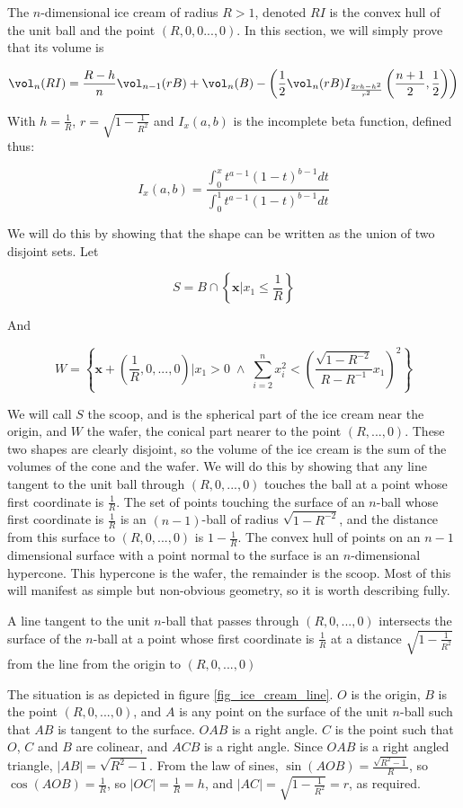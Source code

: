 The $n$-dimensional ice cream of radius $R>1$, denoted $RI$ is the convex hull of the unit ball and the point $(R,0,0...,0)$. In this section, we will simply prove that its volume is

$$
\vol_n(RI) = \frac{R-h}{n} \vol_{n-1}(rB) + \vol_n(B) - \left(\frac{1}{2}\vol_n(rB) I_{\frac{2rh-h^2}{r^2}}\left(\frac{n+1}{2}, \frac{1}{2}\right)\right)
$$

With $h = \frac{1}{R}$, $r = \sqrt{1-\frac{1}{R^2}}$ and $I_x(a,b)$ is the incomplete beta function, defined thus:

$$
I_x(a,b) = \frac{\int^x_0 t^{a-1}(1-t)^{b-1}dt}{\int^1_0 t^{a-1}(1-t)^{b-1} dt}
$$

We will do this by showing that the shape can be written as the union of two disjoint sets. Let

$$
S = B \cap \left\{{\bm x} | x_1 \leqslant \frac{1}{R}\right\}
$$

And

$$
W = \left\{{\bm x} + \left(\frac{1}{R}, 0, ..., 0\right) | x_1 > 0 \; \wedge \; \sum^{n}_{i=2} x_i^2 < \left(\frac{\sqrt{1-R^{-2}}}{R-R^{-1}} x_1\right)^2 \right\}
$$

We will call $S$ the scoop, and is the spherical part of the ice cream near the origin, and $W$ the wafer, the conical part nearer to the point $(R,...,0)$. These two shapes are clearly disjoint, so the volume of the ice cream is the sum of the volumes of the cone and the wafer. We will do this by showing that any line tangent to the unit ball through $(R,0,...,0)$ touches the ball at a point whose first coordinate is $\frac{1}{R}$.  The set of points touching the surface of an $n$-ball whose first coordinate is $\frac{1}{R}$ is an $(n-1)$-ball of radius $\sqrt{1-R^{-2}}$, and the distance from this surface to $(R,0,...,0)$ is $1-\frac{1}{R}$. The convex hull of points on an $n-1$ dimensional surface with a point normal to the surface is an $n$-dimensional hypercone. This hypercone is the wafer, the remainder is the scoop. Most of this will manifest as simple but non-obvious geometry, so it is worth describing fully.

\begin{proposition}
A line tangent to the unit $n$-ball that passes through $(R,0,...,0)$ intersects the surface of the $n$-ball at a point whose first coordinate is $\frac{1}{R}$ at a distance $\sqrt{1-\frac{1}{R^2}}$ from the line from the origin to $(R,0,...,0)$
\end{proposition}

The situation is as depicted in figure \ref{fig_ice_cream_line}. $O$ is the origin, $B$ is the point $(R,0,...,0)$, and $A$ is any point on the surface of the unit $n$-ball such that $AB$ is tangent to the surface. $OAB$ is a right angle. $C$ is the point such that $O$, $C$ and $B$ are colinear, and $ACB$ is a right angle. Since $OAB$ is a right angled triangle, $|AB| = \sqrt{R^2-1}$. From the law of sines, $\sin(AOB) = \frac{\sqrt{R^2-1}}{R}$, so $\cos(AOB) = \frac{1}{R}$, so $|OC| = \frac{1}{R} = h$, and $|AC| = \sqrt{1-\frac{1}{R^2}} = r$, as required.

